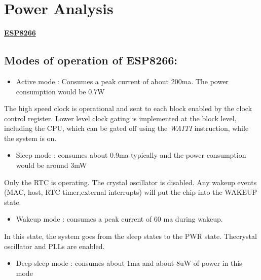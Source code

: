 \documentclass[16pt]{article}
\begin{document}
	
\hfill 	

\vspace{20cm}


\section{Power Analysis}
\vspace{0.5cm}

{\Large{\underline{\textbf{ESP8266}}}}

\vspace{0.2cm}

\subsection{Modes of operation of
ESP8266:}

\begin{itemize}

\item
  Active mode : Consumes a peak current of about 200ma. The power
  consumption would be 0.7W
\end{itemize}

The high speed clock is operational and sent to each block enabled by
the clock control register. Lower level clock gating is implemented at
the block level, including the CPU, which can be gated off using the
\emph{WAITI} instruction, while the system is on.

\begin{itemize}

\item
  Sleep mode : consumes about 0.9ma typically and the power consumption
  would be around 3mW
\end{itemize}

Only the RTC is operating. The crystal oscillator is disabled. Any
wakeup events (MAC, host, RTC timer,external interrupts) will put the
chip into the WAKEUP state.

\begin{itemize}

\item
  Wakeup mode : consumes a peak current of 60 ma during wakeup.
\end{itemize}

In this state, the system goes from the sleep states to the PWR state.
Thecrystal oscillator and PLLs are enabled.

\begin{itemize}

\item
  Deep-sleep mode : consumes about 1ma and about 8uW of power in this
  mode
\end{itemize}
\end{document}
